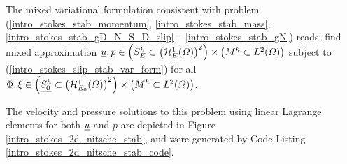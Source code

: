 The mixed variational formulation  consistent with problem (\ref{intro_stokes_stab_momentum}, \ref{intro_stokes_stab_mass}, \ref{intro_stokes_stab_gD_N_S_D_slip} -- \ref{intro_stokes_stab_gN}) reads: find mixed approximation $\underline{u}, p \in \left( \underline{S_E^h} \subset \left( \mathcal{H}_E^1(\varOmega) \right)^2 \right) \times \left( M^h \subset L^2(\varOmega) \right)$ subject to (\ref{intro_stokes_slip_stab_var_form}) for all $\underline{\Phi}, \xi \in \left(\underline{S_0^h} \subset \left( \mathcal{H}_{E_0}^1(\varOmega) \right)^2 \right) \times \left( M^h \subset L^2(\varOmega) \right)$.

The velocity and pressure solutions to this problem using linear Lagrange elements for both $\underline{u}$ and $p$ are depicted in Figure \ref{intro_stokes_2d_nitsche_stab}, and were generated by Code Listing \ref{intro_stokes_2d_nitsche_stab_code}.


